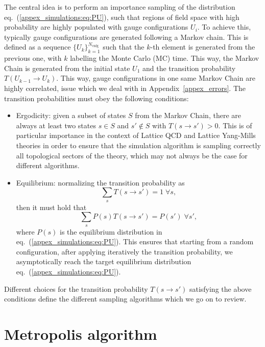 The central idea is to perform an importance sampling of the distribution eq.~(\ref{appex_simulations:eq:PU}), such that regions of field space with high probability are highly populated with gauge configurations $U_i$.  To achieve this, typically gauge configurations are generated following a Markov chain. This is defined as a sequence $\{U_k\}_{k=1}^{N_{\textrm{cnfg}}}$ such that the $k$-th element is generated from the previous one, with $k$ labelling the Monte Carlo (MC) time. This way, the Markov Chain is generated from the initial state $U_1$ and the transition probability $T(U_{k-1}\rightarrow U_k)$. This way, gauge configurations in one same Markov Chain are highly correlated, issue which we deal with in Appendix~\ref{appex_errors}. The transition probabilities must obey the following conditions:
\begin{itemize}
\item Ergodicity: given a subset of states $S$ from the Markov Chain, there are always at least two states $s\in S$ and $s'\notin S$ with $T(s\rightarrow s')>0$. This is of particular importance in the context of Lattice QCD and Lattice Yang-Mills theories in order to ensure that the simulation algorithm is sampling correctly all topological sectors of the theory, which may not always be the case for different algorithms.
\item Equilibrium: normalizing the transition probability as
\begin{equation}
\sum_sT(s\rightarrow s')=1\;\forall s,
\end{equation}
then it must hold that
\begin{equation}
\sum_sP(s)T(s\rightarrow s')=P(s')\;\forall s',
\end{equation}
where $P(s)$ is the equilibrium distribution in eq.~(\ref{appex_simulations:eq:PU}). This ensures that starting from a random configuration, after applying iteratively the transition probability, we asymptotically reach the target equilibrium distribution eq.~(\ref{appex_simulations:eq:PU}). 
\end{itemize}

Different choices for the transition probability $T(s\rightarrow s')$ satisfying the above conditions define the different sampling algorithms which we go on to review. 

\section{Metropolis algorithm}

